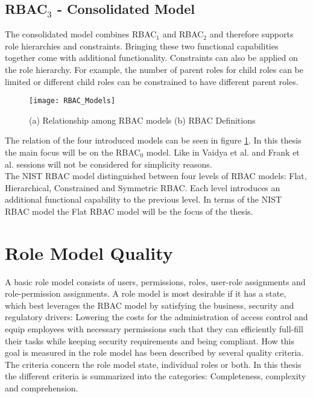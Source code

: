         \subsection{RBAC$_3$ - Consolidated Model}
            The consolidated model combines RBAC$_1$ and RBAC$_2$ and therefore supports role hierarchies and constraints. Bringing these two functional capabilities together come with additional functionality. Constraints can also be applied on the role hierarchy. For example, the number of parent roles for child roles can be limited or different child roles can be constrained to have different parent roles.\\
    \begin{figure}[H]
        \centering
        \texttt{[image: RBAC\_Models]}
        \caption{(a) Relationship among RBAC models\cite{Sandhu:1996} (b) RBAC Definitions\cite{tassey2002economic}}
        \label{fig:rbacmodels}
    \end{figure}
    The relation of the four introduced models can be seen in figure \ref{fig:rbacmodels}. In this thesis the main focus will be on the RBAC$_0$ model. Like in Vaidya et al.\cite{Vaidya:2007} and Frank et al.\cite{Frank:2013} sessions will not be considered for simplicity reasons.\\
    The NIST RBAC model \cite{sandhu2000nist} distinguished between four levels of RBAC models: Flat, Hierarchical, Constrained and Symmetric RBAC. Each level introduces an additional functional capability to the previous level. In terms of the NIST RBAC model the Flat RBAC model will be the focus of the thesis.
    
    \section{Role Model Quality}
    \label{sec:rmQuality}
    A basic role model consists of users, permissions, roles, user-role assignments and role-permission assignments. A role model is most desirable if it has a state, which best leverages the RBAC model by satisfying the business, security and regulatory drivers: Lowering the costs for the administration of access control and equip employees with necessary permissions such that they can efficiently full-fill their tasks while keeping security requirements and being compliant.
    How this goal is measured in the role model has been described by several quality criteria\cite{Kunz}\cite{Frank}. The criteria concern the role model state, individual roles or both. In this thesis the different criteria is summarized into the categories: Completeness, complexity and comprehension.
